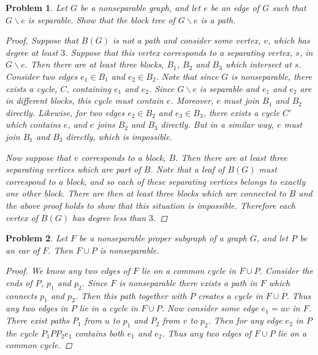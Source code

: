 \documentclass{article}
\newtheorem{problem}{Problem}
\begin{document}
\begin{flushleft}
\begin{problem}
Let $G$ be a nonseparable graph, and let $e$ be an edge of $G$ such that $G \backslash e$ is separable. Show that the block tree of $G \backslash e$ is a path.
\begin{proof}
Suppose that $B(G)$ is not a path and consider some vertex, $v$, which has degree at least $3$. Suppose that this vertex corresponds to a separating vertex, $s$, in $G \backslash e$. Then there are at least three blocks, $B_1$, $B_2$ and $B_3$ which intersect at $s$. Consider two edges $e_1 \in B_1$ and $e_2 \in B_2$. Note that since $G$ is nonseparable, there exists a cycle, $C$, containing $e_1$ and $e_2$. Since $G \backslash e$ is separable and $e_1$ and $e_2$ are in different blocks, this cycle must contain $e$. Moreover, $e$ must join $B_1$ and $B_2$ directly. Likewise, for two edges $e_2 \in B_2$ and $e_3 \in B_3$, there exists a cycle $C'$ which contains $e$, and $e$ joins $B_2$ and $B_3$ directly. But in a similar way, $e$ must join $B_1$ and $B_3$ directly, which is impossible.\newline

Now suppose that $v$ corresponds to a block, $B$. Then there are at least three separating vertices which are part of $B$. Note that a leaf of $B(G)$ must correspond to a block, and so each of these separating vertices belongs to exactly one other block. There are then at least three blocks which are connected to $B$ and the above proof holds to show that this situation is impossible. Therefore each vertex of $B(G)$ has degree less than $3$.
\end{proof}
\end{problem}

\begin{problem}
Let $F$ be a nonseparable proper subgraph of a graph $G$, and let $P$ be an ear of $F$. Then $F \cup P$ is nonseparable.
\begin{proof}
We know any two edges of $F$ lie on a common cycle in $F \cup P$. Consider the ends of $P$, $p_1$ and $p_2$. Since $F$ is nonseparable there exists a path in $F$ which connects $p_1$ and $p_2$. Then this path together with $P$ creates a cycle in $F \cup P$. Thus any two edges in $P$ lie in a cycle in $F \cup P$. Now consider some edge $e_1 = uv$ in $F$. There exist paths $P_1$ from $u$ to $p_1$ and $P_2$ from $v$ to $p_2$. Then for any edge $e_2$ in $P$ the cycle $P_1PP_2e_1$ contains both $e_1$ and $e_2$. Thus any two edges of $F \cup P$ lie on a common cycle.
\end{proof}
\end{problem}


\end{flushleft}
\end{document}
